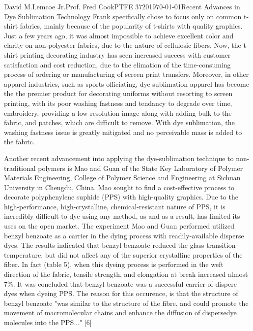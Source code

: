 \documentclass[12pt,letterpaper]{article}
\begin{document}
\begin{mla}{David M.}{Lemcoe Jr.}{Prof. Fred Cook}{PTFE 3720}{\today}{Recent Advances in Dye Sublimation Technology}
Frank specifically chose to focus only on common t-shirt fabrics, mainly because of the popularity of t-shirts with quality graphics. Just a few years ago, it was almost impossible to achieve excellent color and clarity on non-polyester fabrics, due to the nature of cellulosic fibers. Now, the t-shirt printing decorating industry has seen increased success with customer satisfaction and cost reduction, due to the elimation of the time-consuming process of ordering or manufacturing of screen print transfers. Moreover, in other apparel industries, such as sports officiating, dye sublimation apparel has become the the premier product for decorating uniforms without resorting to screen printing, with its poor washing fastness and tendancy to degrade over time, embroidery, providing a low-resolution image along with adding bulk to the fabric, and patches, which are difficult to remove. With dye sublimation, the washing fastness issue is greatly mitigated and no perceivable mass is added to the fabric. 

Another recent advancement into applying the dye-sublimation technique to non-traditional polymers is Mao and Guan of the State Key Laboratory of Polymer Materials Engineering, College of Polymer Science and Engineering at Sichuan University in Chengdu, China. Mao sought to find a cost-effective process to decorate polyphenylene suphide (PPS) with high-quality graphics. Due to the high-performance, high-crystalline, chemical-resistant nature of PPS, it is incredibly difficult to dye using any method, as and as a result, has limited its uses on the open market. The experiment Mao and Guan performed utilized benzyl benzoate as a carrier in the dying process with readily-available disperse dyes. The results indicated that benzyl benzoate reduced the glass transition temperature, but did not affect any of the superior crystalline properties of the fiber. In fact (table 5), when this dyeing process is performed in the weft direction of the fabric, tensile strength, and elongation at break increased almost 7\%. It was concluded that benzyl benzoate was a successful carrier of dispere dyes when dyeing PPS. The reason for this occurence, is that the structure of benzyl benzoate "was similar to the structure of the fibre, and could promote the movement of macromolecular chains and enhance the diffusion of dispersedye molecules into the PPS..." [6]


\end{mla}
\end{document}
